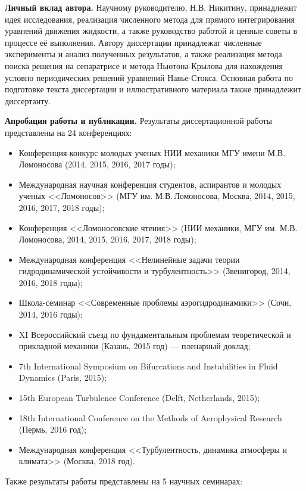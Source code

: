 {\bf Личный вклад автора.} 
Научному руководителю, Н.В. Никитину, принадлежит идея исследования, реализация численного метода для прямого интегрирования уравнений движения жидкости, а также руководство работой и ценные советы в процессе её выполнения. Автору диссертации принадлежат численные эксперименты и анализ полученных результатов, а также реализация метода поиска решения на сепаратрисе и метода Ньютона-Крылова для нахождения условно периодических решений уравнений Навье-Стокса. Основная работа по подготовке текста диссертации и иллюстративного материала также принадлежит диссертанту. 


{\bf Апробация работы и публикации.} 
Результаты диссертационной работы представлены на 24 конференциях: 
\begin{itemize}
\item Конференция-конкурс молодых ученых НИИ механики МГУ имени М.В. Ломоносова (2014, 2015, 2016, 2017 годы); 
\item Международная научная конференция студентов, аспирантов и молодых ученых <<Ломоносов>> (МГУ им. М.В.\,Ломоносова, Москва, 2014, 2015, 2016, 2017, 2018 годы); 
\item Конференция <<Ломоносовские чтения>> (НИИ механики, МГУ им. М.В. Ломоносова, 2014, 2015, 2016, 2017, 2018 годы); 
\item Международная конференция <<Нелинейные задачи теории гидродинамической устойчивости и турбулентность>> (Звенигород, 2014, 2016, 2018 годы); 
\item Школа-семинар <<Современные проблемы аэрогидродинамики>> (Сочи, 2014, 2016 годы);  
\item XI Всероссийский съезд по фундаментальным проблемам теоретической и прикладной механики (Казань, 2015 год) --- пленарный доклад;
\item 7th International Symposium on Bifurcations and Instabilities in Fluid Dynamics (Paris, 2015);
\item 15th European Turbulence Conference (Delft, Netherlands, 2015); 
\item 18th International Conference on the Methods of Aerophysical Research (Пермь, 2016 год);
\item Международная конференция <<Турбулентность, динамика атмосферы и климата>> (Москва, 2018 год).
\end{itemize}
Также результаты работы представлены на 5 научных семинарах:
